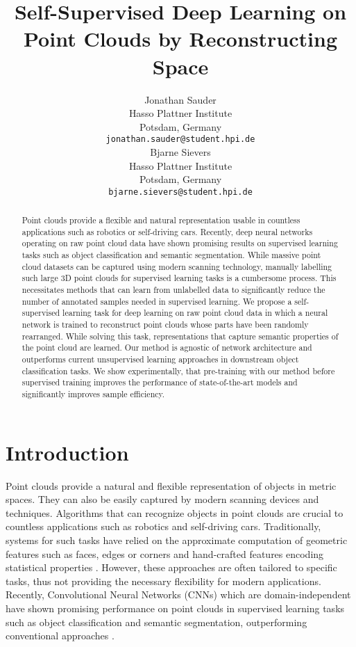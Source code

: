 \documentclass{article}
\title{Self-Supervised Deep Learning on Point Clouds by Reconstructing Space}
\author{Jonathan Sauder \\
  Hasso Plattner Institute\\
  Potsdam, Germany\\
  \texttt{jonathan.sauder@student.hpi.de} \\
  \And
  Bjarne Sievers \\
  Hasso Plattner Institute\\
  Potsdam, Germany\\
  \texttt{bjarne.sievers@student.hpi.de} \\
}
\begin{document}
\maketitle

\begin{abstract}
Point clouds provide a flexible and natural representation usable in countless applications such as robotics or self-driving cars. Recently, deep neural networks operating on raw point cloud data have shown promising results on supervised learning tasks such as object classification and semantic segmentation. While massive point cloud datasets can be captured using modern scanning technology, manually labelling such large 3D point clouds for supervised learning tasks is a cumbersome process. This necessitates methods that can learn from unlabelled data to significantly reduce the number of annotated samples needed in supervised learning. We propose a self-supervised learning task for deep learning on raw point cloud data in which a neural network is trained to reconstruct point clouds whose parts have been randomly rearranged. While solving this task, representations that capture semantic properties of the point cloud are learned. Our method is agnostic of network architecture and outperforms current unsupervised learning approaches in downstream object classification tasks. We show experimentally, that pre-training with our method before supervised training improves the performance of state-of-the-art models and significantly improves sample efficiency.
\end{abstract}

\section{Introduction}
Point clouds provide a natural and flexible representation of objects in metric spaces. They can also be easily captured by modern scanning devices and techniques. Algorithms that can recognize objects in point clouds are crucial to countless applications such as robotics and self-driving cars. Traditionally, systems for such tasks have relied on the approximate computation of geometric features such as faces, edges or corners \cite{traditionalfeatures1, traditionalfeatures2} and hand-crafted features encoding statistical properties \cite{statisticalfeatures1, statisticalfeatures2}. However, these approaches are often tailored to specific tasks, thus not providing the necessary flexibility for modern applications. Recently, Convolutional Neural Networks (CNNs) which are domain-independent have shown promising performance on point clouds in supervised learning tasks such as object classification and semantic segmentation, outperforming conventional approaches \cite{pointnet, pointnet++, dgcnn, pointcnn}.
\end{document}
